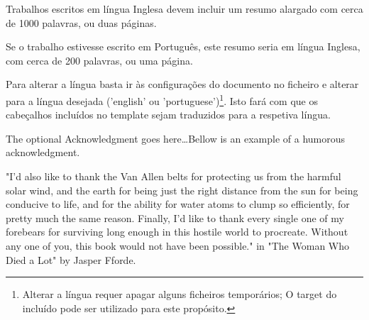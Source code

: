 \begin{abstractotherlanguage}

Trabalhos escritos em língua Inglesa devem incluir um resumo alargado com cerca de 1000 palavras, ou duas páginas.

Se o trabalho estivesse escrito em Português, este resumo seria em língua Inglesa, com cerca de 200 palavras, ou uma página.

Para alterar a língua basta ir às configurações do documento no ficheiro  e alterar para a língua desejada ('english' ou 'portuguese')\footnote{Alterar a língua requer apagar alguns ficheiros temporários; O target  do  incluído pode ser utilizado para este propósito.}. Isto fará com que os cabeçalhos incluídos no template sejam traduzidos para a respetiva língua.

\end{abstractotherlanguage}


\begin{acknowledgements}

The optional Acknowledgment goes here\ldots Bellow is an example of a humorous acknowledgment.

"I'd also like to thank the Van Allen belts for protecting us from the harmful solar wind, and the earth for being just the right distance from the sun for being conducive to life, and for the ability for water atoms to clump so efficiently, for pretty much the same reason. Finally, I'd like to thank every single one of my forebears for surviving long enough in this hostile world to procreate. Without any one of you, this book would not have been possible." in "The Woman Who Died a Lot" by Jasper Fforde.
\end{acknowledgements}


\tableofcontents %

